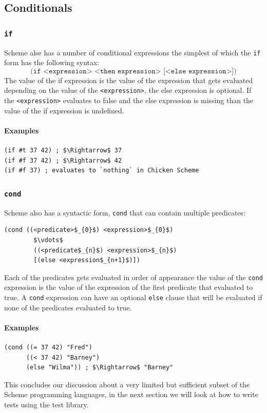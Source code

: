 \documentclass[12pt,a4paper,english,twoside]{article}
\begin{document}
\subsection{Conditionals}
\subsubsection{\texttt{if}}
Scheme alse has a number of conditional expressions the simplest of which the 
\texttt{if} form has the following syntax:
\begin{equation*}
    \texttt{(if <expression> <then expression> [<else expression>])}
\end{equation*}
The value of the if expression is the value of 
the expression that gets evaluated depending on the value of the 
\texttt{<expression>}, the else expression is optional. If the 
\texttt{<expression>} evaluates to false and the else expression is missing 
than the value of the if expression is undefined.
\paragraph{Examples}
\begin{lstlisting}
(if #t 37 42) ; $\Rightarrow$ 37
(if #f 37 42) ; $\Rightarrow$ 42
(if #f 37) ; evaluates to `nothing` in Chicken Scheme
\end{lstlisting}
\subsubsection{\texttt{cond}}
Scheme also has a syntactic form, \texttt{cond} that can contain multiple 
predicates:
\begin{lstlisting}[mathescape]
  (cond ((<predicate>$_{0}$) <expression>$_{0}$) 
        $\vdots$ 
        ((<predicate$_{n}$) <expression>$_{n}$) 
        [(else <expression$_{n+1}$)])
\end{lstlisting}
Each of the predicates gets evaluated in order of appearance the value of the 
\texttt{cond} expression is the value of the expression of the first predicate 
that evaluated to true. A \texttt{cond} expression can have an optional 
\texttt{else} clause that will be evaluated if none of the predicates 
evaluated to true.
\paragraph{Examples}
\begin{lstlisting}
(cond ((= 37 42) "Fred")
      ((< 37 42) "Barney")
      (else "Wilma")) ; $\Rightarrow$ "Barney"
\end{lstlisting}
This concludes our discussion about a very limited but sufficient subset of 
the Scheme programming languages, in the next section we will look at how to 
write tests using the test library.
\end{document}
